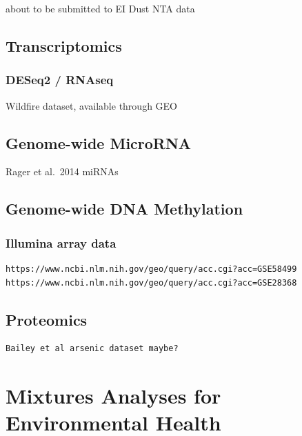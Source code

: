 \documentclass[
]{book}
\begin{document}
about to be submitted to EI
Dust NTA data

\hypertarget{transcriptomics}{%
\section{Transcriptomics}\label{transcriptomics}}

\hypertarget{deseq2-rnaseq}{%
\subsection{DESeq2 / RNAseq}\label{deseq2-rnaseq}}

Wildfire dataset, available through GEO

\hypertarget{genome-wide-microrna}{%
\section{Genome-wide MicroRNA}\label{genome-wide-microrna}}

Rager et al.~2014 miRNAs

\hypertarget{genome-wide-dna-methylation}{%
\section{Genome-wide DNA Methylation}\label{genome-wide-dna-methylation}}

\hypertarget{illumina-array-data}{%
\subsection{Illumina array data}\label{illumina-array-data}}

\begin{verbatim}
https://www.ncbi.nlm.nih.gov/geo/query/acc.cgi?acc=GSE58499
https://www.ncbi.nlm.nih.gov/geo/query/acc.cgi?acc=GSE28368
\end{verbatim}

\hypertarget{proteomics}{%
\section{Proteomics}\label{proteomics}}

\begin{verbatim}
Bailey et al arsenic dataset maybe?
\end{verbatim}

\hypertarget{mixtures-analyses-for-environmental-health}{%
\chapter{Mixtures Analyses for Environmental Health}\label{mixtures-analyses-for-environmental-health}}
\end{document}
